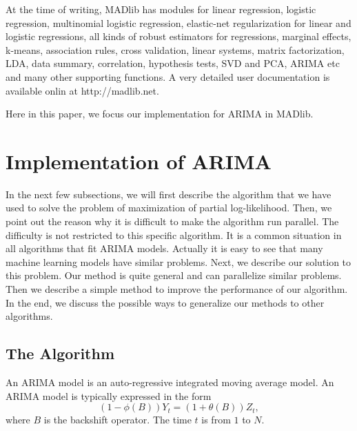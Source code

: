 \documentclass[english,10pt]{llncs}
\begin{document}

At the time of writing, MADlib has modules for linear regression,
logistic regression, multinomial logistic regression, elastic-net
regularization for linear and logistic regressions, all kinds of
robust estimators for regressions, marginal effects, k-means,
association rules, cross validation, linear systems, matrix
factorization, LDA, data summary, correlation, hypothesis tests, SVD
and PCA, ARIMA etc and many other supporting functions.  A very
detailed user documentation is available onlin at http://madlib.net.

Here in this paper, we focus our implementation for ARIMA in MADlib.

\section{Implementation of ARIMA}


In the next few subsections, we will first describe the algorithm that
we have used to solve the problem of maximization of partial
log-likelihood. Then, we point out the reason why it is difficult to
make the algorithm run parallel.  The difficulty is not restricted to
this specific algorithm. It is a common situation in all algorithms
that fit ARIMA models. Actually it is easy to see that many machine
learning models have similar problems. Next, we describe our solution
to this problem. Our method is quite general and can parallelize
similar problems. Then we describe a simple method to improve the
performance of our algorithm. In the end, we discuss the possible ways
to generalize our methods to other algorithms.

\subsection{The Algorithm}


An ARIMA model is an auto-regressive integrated moving average model. An ARIMA
model is typically expressed in the form
\begin{equation}
(1 - \phi(B)) Y_t  = (1 + \theta(B)) Z_t,
\end{equation}
where $B$ is the backshift operator. The time $t$ is from $1$ to $N$.
\end{document}
